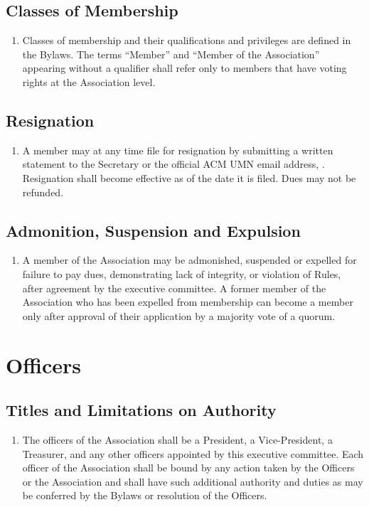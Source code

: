 \subsection{Classes of Membership}
\begin{enumerate}
	\item Classes of membership and their qualifications and privileges are defined in the Bylaws. The terms ``Member'' and ``Member of the Association'' appearing without a qualifier shall refer only to members  that have voting rights at the Association level.
\end{enumerate}

\subsection{Resignation}
\begin{enumerate}
	\item A member may at any time file for resignation by submitting a written statement to the Secretary or the official ACM UMN email address, \email. Resignation shall become effective as of the date it is filed. Dues may not be refunded.
\end{enumerate}

\subsection{Admonition, Suspension and Expulsion}
\begin{enumerate}
	\item A member of the Association may be admonished, suspended or expelled for failure to pay dues, demonstrating lack of integrity, or violation of Rules, after agreement by the executive committee. A former member of the Association who has been expelled from membership can become a member only after approval of their application by a majority vote of a quorum.
\end{enumerate}

\section{Officers}

\subsection{Titles and Limitations on Authority}
\begin{enumerate}
	\item The officers of the Association shall be a President, a Vice-President, a Treasurer, and any other officers appointed by this executive committee. Each officer of the Association shall be bound by any action taken by the Officers or the Association and shall have such additional authority and duties as may be conferred by the Bylaws or resolution of the Officers.
\end{enumerate}

